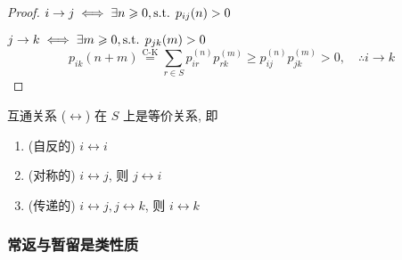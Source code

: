 \begin{proof}
$i\to j\iff\exists n\geqslant 0,\text{s.t. } p_{ij}(n)>0$

$j\to k\iff\exists m\geqslant 0,\text{s.t. } p_{jk}(m)>0$
\[
p_{ik}(n+m)\overset{\text{C-K}}{=}\sum_{r\in S}p_{ir}^{(n)}p_{rk}^{(m)}\geq p_{ij}^{(n)}p_{jk}^{(m)}>0,\quad \therefore i\to k
\]
\end{proof}

\begin{property}
    互通关系 ($\leftrightarrow$) 在 $S$ 上是等价关系, 即
    \begin{enumerate}
        \item (自反的) $i\leftrightarrow i$
        \item (对称的) $i\leftrightarrow j$, 则 $j\leftrightarrow i$
        \item (传递的) $i\leftrightarrow j, j\leftrightarrow k$, 则 $i\leftrightarrow k$
    \end{enumerate}
\end{property}

\subsubsection{常返与暂留是类性质}

